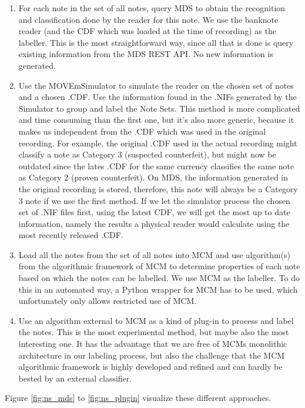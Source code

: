 \begin{enumerate}
\item For each note in the set of all notes, query MDS to obtain the recognition and classification done by the reader for this note. We use the banknote reader (and the CDF which was loaded at the time of recording) as the labeller. This is the most straightforward way, since all that is done is query existing information from the MDS REST API. No new information is generated.
\item Use the MOVEmSimulator to simulate the reader on the chosen set of notes and a chosen .CDF. Use the information found in the .NIFs generated by the Simulator to group and label the Note Sets. This method is more complicated and time consuming than the first one, but it's also more generic, because it makes us independent from the .CDF which was used in the original recording. For example, the original .CDF used in the actual recording might classify a note as Category 3 (suspected counterfeit), but might now be outdated since the lates .CDF for the same currency classifies the same note as Category 2 (proven counterfeit). On MDS, the information generated in the original recording is stored, therefore, this note will always be a Category 3 note if we use the first method. If we let the simulator process the chosen set of .NIF files first, using the latest CDF, we will get the most up to date information, namely the results a physical reader would calculate using the most recently released .CDF.
\item Load all the notes from the set of all notes into MCM and use algorithm(s) from the algorithmic framework of MCM to determine properties of each note based on which the notes can be labelled. We use MCM as the labeller. To do this in an automated way, a Python wrapper for MCM has to be used, which unfortunately only allows restricted use of MCM.
\item Use an algorithm external to MCM as a kind of plug-in to process and label the notes. This is the most experimental method, but maybe also the most interesting one. It has the advantage that we are free of MCMs monolithic architecture in our labeling process, but also the challenge that the MCM algorithmic framework is highly developed and refined and can hardly be bested by an external classifier.
\end{enumerate}
\par Figure \ref{fig:ns_mds} to \ref{fig:ns_plugin} visualize these different approaches.

